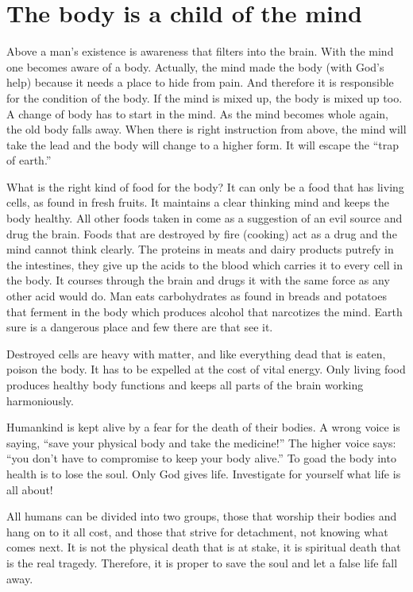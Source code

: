 \documentclass[landscape,twocolumn,letterpaper]{article}
\begin{document}
\section{The body is a child of the mind}
\label{sec:tbiacotm}

Above a man's existence is awareness that filters into the brain. With
the mind one becomes aware of a body. Actually, the mind made the body
(with God's help) because it needs a place to hide from pain. And
therefore it is responsible for the condition of the body. If the mind
is mixed up, the body is mixed up too. A change of body has to start
in the mind. As the mind becomes whole again, the old body falls
away. When there is right instruction from above, the mind will take
the lead and the body will change to a higher form. It will escape the
``trap of earth.''

What is the right kind of food for the body? It can only be a food
that has living cells, as found in fresh fruits. It maintains a clear
thinking mind and keeps the body healthy. All other foods taken in
come as a suggestion of an evil source and drug the brain. Foods that
are destroyed by fire (cooking) act as a drug and the mind cannot
think clearly. The proteins in meats and dairy products putrefy in the
intestines, they give up the acids to the blood which carries it to
every cell in the body. It courses through the brain and drugs it with
the same force as any other acid would do. Man eats carbohydrates as
found in breads and potatoes that ferment in the body which produces
alcohol that narcotizes the mind. Earth sure is a dangerous place and
few there are that see it.

Destroyed cells are heavy with matter, and like everything dead that
is eaten, poison the body. It has to be expelled at the cost of vital
energy. Only living food produces healthy body functions and keeps all
parts of the brain working harmoniously.

Humankind is kept alive by a fear for the death of their bodies. A
wrong voice is saying, ``save your physical body and take the
medicine!'' The higher voice says: ``you don't have to compromise to
keep your body alive.'' To goad the body into health is to lose the
soul. Only God gives life. Investigate for yourself what life is all
about!

All humans can be divided into two groups, those that worship their
bodies and hang on to it all cost, and those that strive for
detachment, not knowing what comes next. It is not the physical death
that is at stake, it is spiritual death that is the real
tragedy. Therefore, it is proper to save the soul and let a false life
fall away.
\end{document}
